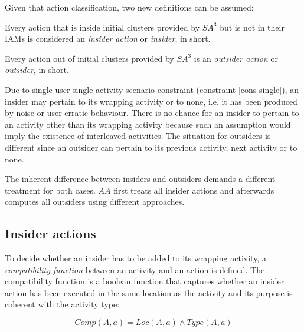 Given that action classification, two new definitions can be assumed:

\begin{defn}
\label{def-insider}
 Every action that is inside initial clusters provided by $SA^3$ but is not in their IAMs is considered an \textit{insider action} or \textit{insider}, in short.
\end{defn}

\begin{defn}
\label{def-outsider}
 Every action out of initial clusters provided by $SA^3$ is an \textit{outsider action} or \textit{outsider}, in short.
\end{defn}

Due to single-user single-activity scenario constraint (constraint \ref{cons-single}), an insider may pertain to its wrapping activity or to none, i.e. it has been produced by noise or user erratic behaviour. There is no chance for an insider to pertain to an activity other than its wrapping activity because such an assumption would imply the existence of interleaved activities. The situation for outsiders is different since an outsider can pertain to its previous activity, next activity or to none. 

The inherent difference between insiders and outsiders demands a different treatment for both cases. $AA$ first treats all insider actions and afterwards computes all outsiders using different approaches.

\subsection{Insider actions}
To decide whether an insider has to be added to its wrapping activity, a \textit{compatibility function} between an activity and an action is defined. The compatibility function is a boolean function that captures whether an insider action has been executed in the same location as the activity and its purpose is coherent with the activity type:

\begin{equation}
\label{eq-comp}
 Comp(A, a) = Loc(A, a) \wedge Type(A, a)
\end{equation}

